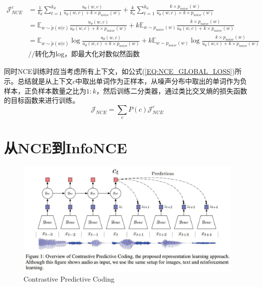 \documentclass{article}
\begin{document}
\begin{equation}
    \begin{split}
        \mathcal{J}_{NCE}^{c} &= \frac{1}{k_d} \sum_{t=1}^{k_d} \frac{u_\theta (w,c)}{u_\theta (w,c) + k \times p_{noise}(w)} + \frac{k}{k_n} \sum_{t=1}^{k_n} \frac{k \times p_{noise}(w)}{u_\theta (w,c) + k \times p_{noise}(w)} \\
        &= \mathbb{E}_{w \sim \tilde{p}(w|c)} \frac{u_\theta (w,c)}{u_\theta (w,c) + k \times p_{noise}(w)} + k \mathbb{E}_{w \sim p_{noise}(w)} \frac{k \times p_{noise}(w)}{u_\theta (w,c) + k \times p_{noise}(w)} \\
        &= \mathbb{E}_{w \sim \tilde{p}(w|c)} \log \frac{u_\theta (w,c)}{u_\theta (w,c) + k \times p_{noise}(w)} + k \mathbb{E}_{w \sim p_{noise}(w)} \log \frac{k \times p_{noise}(w)}{u_\theta (w,c) + k \times p_{noise}(w)} \\
        &// \text{转化为log，即最大化对数似然函数}
    \end{split}
    \label{EQ:NCE_LOG_LOSS}
\end{equation}

同时NCE训练时应当考虑所有上下文，如公式(\ref{EQ:NCE_GLOBAL_LOSS})所示。总结就是从上下文$c$中取出单词作为正样本，从噪声分布中取出的单词作为负样本，正负样本数量之比为$1:k$，然后训练二分类器，通过类比交叉熵的损失函数的目标函数来进行训练。
\begin{equation}
    \mathcal{J}_{NCE} = \sum_{c} P(c)\mathcal{J}_{NCE}^c
    \label{EQ:NCE_GLOBAL_LOSS}
\end{equation}


\section{从NCE到InfoNCE}

\begin{figure}
    \centering
    \includegraphics[width=15cm]{graphics/CPC.eps}
    \caption{Contrastive Predictive Coding}
    \label{FIG:CPC}
\end{figure}
\end{document}
